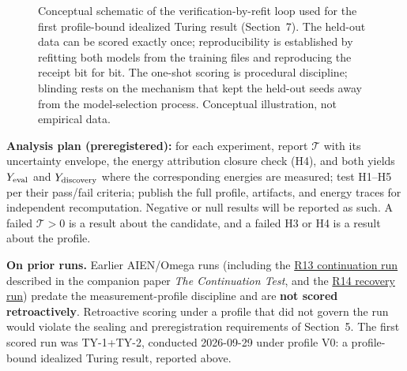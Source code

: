 \documentclass[11pt]{article}
\begin{document}
\begin{figure}[htbp]
\centering
{}
\caption{Conceptual schematic of the verification-by-refit loop used for the first profile-bound idealized Turing result (Section~7). The held-out data can be scored exactly once; reproducibility is established by refitting both models from the training files and reproducing the receipt bit for bit. The one-shot scoring is procedural discipline; blinding rests on the mechanism that kept the held-out seeds away from the model-selection process. Conceptual illustration, not empirical data.}
\label{fig:refit}
\end{figure}

\textbf{Analysis plan (preregistered):} for each experiment, report \(\mathcal{T}\) with its uncertainty envelope, the energy attribution closure check (H4), and both yields \(Y_{\rm eval}\) and \(Y_{\rm discovery}\) where the corresponding energies are measured; test H1--H5 per their pass/fail criteria; publish the full profile, artifacts, and energy traces for independent recomputation. Negative or null results will be reported as such. A failed \(\mathcal{T}>0\) is a result about the candidate, and a failed H3 or H4 is a result about the profile.

\textbf{On prior runs.} Earlier AIEN/Omega runs (including the \href{https://github.com/aien-dev/omega/pull/49}{R13 continuation run} described in the companion paper \textit{The Continuation Test}, and the \href{https://github.com/aien-dev/omega/pull/50}{R14 recovery run}) predate the measurement-profile discipline and are \textbf{not scored retroactively}. Retroactive scoring under a profile that did not govern the run would violate the sealing and preregistration requirements of Section~5. The first scored run was TY-1+TY-2, conducted 2026-09-29 under profile V0: a profile-bound idealized Turing result, reported above.
\end{document}
